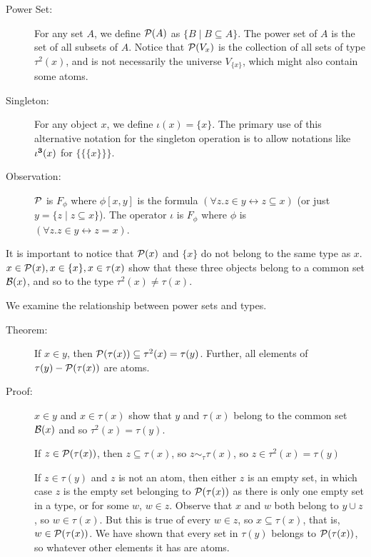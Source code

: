 \documentclass[12pt]{book}
\begin{document}
\begin{description}

\item[Power Set:] For any set $A$, we define ${\cal P}(A)$ as $\{B
\mid B \subseteq A\}$.  The power set of $A$ is the set of all subsets
of $A$.  Notice that ${\cal P}(V_x)$ is the collection of all
sets of type $\tau^2(x)$, and is not necessarily the universe $V_{\{x\}}$,
which might also contain some atoms.

\item[Singleton:]  For any object $x$, we define $\iota(x)=\{x\}$.  The primary use
of this alternative notation for the singleton operation is to allow notations like $\iota^{\bf 3}(x)$ for $\{\{\{x\}\}\}$.

\item[Observation:] $\cal P$ is $F_{\phi}$ where $\phi[x,y]$ is the
formula $(\forall z.z \in y \leftrightarrow z \subseteq x)$ (or just $y = \{z
\mid z \subseteq x\}$).  The operator $\iota$ is $F_{\phi}$ where $\phi$ is \\$(\forall z.z \in y \leftrightarrow z=x)$.

\end{description}

It is important to notice that ${\cal P}(x)$ and $\{x\}$ do not belong to the same type as $x$.  $x \in {\cal P}(x), x \in \{x\}, x \in \tau(x)$ show that these three objects belong to a common set ${\cal B}(x)$, and so to the type $\tau^2(x) \neq \tau(x)$.

We examine the relationship between power sets and types.

\begin{description}

\item[Theorem:]  If $x \in y$, then ${\cal P}(\tau(x)) \subseteq \tau^2(x) = \tau(y)$.  Further, all elements of $\tau(y) - {\cal P}(\tau(x))$ are atoms.

\item[Proof:]  $x \in y$ and $x \in \tau(x)$ show that $y$ and $\tau(x)$ belong to the common set ${\cal B}(x)$ and so $\tau^2(x)=\tau(y)$.

If $z \in {\cal P}(\tau(x))$, then $z \subseteq \tau(x)$, so $z \sim_\tau \tau(x)$, so $z \in \tau^2(x)=\tau(y)$

If $z \in \tau(y)$ and $z$ is not an atom, then either $z$ is an empty set, in which case $z$ is the empty set belonging to ${\cal P}(\tau(x))$ as there is only one empty set in a type,
or for some $w$, $w \in z$.  Observe that $x$ and $w$ both belong to $y \cup z$, so $w \in \tau(x)$.  But this is true of every $w \in z$, so $x \subseteq \tau(x)$, that is,
$w \in {\cal P}(\tau(x))$.  We have shown that every set in $\tau(y)$ belongs to ${\cal P}(\tau(x))$, so whatever other elements it has are atoms.

\end{description}
\end{document}
